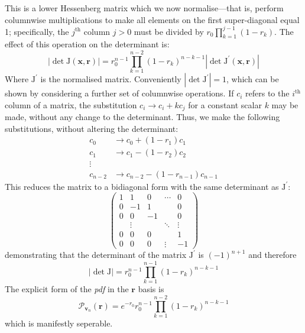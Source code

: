\documentclass[aps,prl,twocolumn,floatfix]{revtex4}
\renewcommand{\vec}[1]{\mathbf{#1}}
\newcommand{\mat}[1]{\mathrm{#1}}
\newcommand{\of}[1]{\!\left(#1\right)}
\newcommand{\pdf}{{\it pdf}}
\newcommand{\abs}[1]{\left|#1\right|}
\newcommand{\prob}[1]{\mathcal{#1}}
\begin{document}
This is a lower Hessenberg matrix which we now normalise---that is, perform
columnwise multiplications to make all elements on the first super-diagonal
equal 1;
specifically, the \(j^{\text{th}}\) column \( j>0 \) must be divided by \( r_0
\prod_{k=1}^{j-1} \left( 1-r_k \right) \). The effect of this operation on the
determinant is:
\begin{equation}
  \abs{ \det \mat{J} \of{ \vec{x}, \vec{r} }} = r_0^{n-1} \prod_{k=1}^{n-2}
  \left( 1-r_k \right)^{n-k-1} \abs{ \det \mat{J}^{\prime} \of{ \vec{x}, \vec{r}
  } }
\end{equation}
Where \( \mat{J}^{\prime} \) is the normalised matrix. Conveniently \( \abs{
\det \mat{J}^{\prime} }=1 \), which can be shown by considering a further set of
columnwise operations. If \( c_i \) refers to the \( i^{\text{th}} \) column of
a matrix, the substitution \( c_i \rightarrow c_i + k c_j \) for a constant
scalar \(k\) may be made, without any change to the determinant. Thus, we make
the following substitutions, without altering the determinant:
\begin{align*}
  c_0 &\rightarrow c_0 + \left( 1-r_1 \right) c_1 \\
  c_1 &\rightarrow c_1 - \left( 1-r_2 \right) c_2 \\
  \vdots \\
  c_{n-2} &\rightarrow c_{n-2} - \left( 1-r_{n-1} \right) c_{n-1}
\end{align*}
This reduces the matrix to a bidiagonal form with the same determinant as \(
\mat{J}^{\prime} \):
\begin{equation*}
  \begin{pmatrix}
    1 & 1 & 0 & \cdots & 0 \\
    0 & -1 & 1 & & 0 \\
    0 & 0 & -1 & & 0 \\
    & \vdots & & \ddots & \vdots \\
    0 & 0 & 0 & & 1 \\
    0 & 0 & 0 & \vdots & -1 
  \end{pmatrix}
\end{equation*}
demonstrating that the determinant of the matrix \( \mat{J}^{\prime} \) is \(
\left( -1 \right)^{n+1} \) and therefore
\begin{equation}
  \abs{ \det \mat{J} } = r_0^{n-1} \prod_{k=1}^{n-1} \left( 1-r_k
  \right)^{n-k-1}
\end{equation}
The explicit form of the \pdf{} in the \(\vec{r}\) basis is
\begin{equation}
  \prob{P}_{\vec{v}_n} \of{ \vec{r} } = e^{-r_0} r_0^{n-1} \prod_{k=1}^{n-2}
  \left( 1-r_k \right)^{n-k-1}
\end{equation}
which is manifestly seperable.
\end{document}

